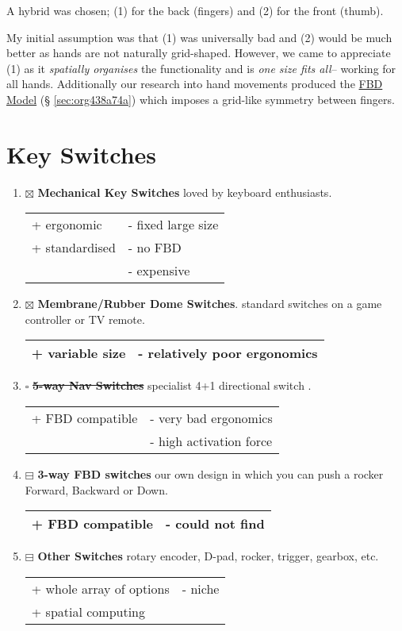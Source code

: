 \documentclass[logo,bsc,singlespacing,parskip]{infthesis}
\begin{document}
A hybrid was chosen; (1) for the back (fingers) and (2) for the front (thumb).

My initial assumption was that (1) was universally bad and (2) would be much better as hands are not naturally grid-shaped.
However, we came to appreciate (1) as it \emph{spatially organises} the functionality and is \emph{one size fits all}-- working for all hands.
Additionally our research into hand movements produced the \hyperref[sec:org438a74a]{FBD Model} (§ \ref{sec:org438a74a}) which imposes a grid-like symmetry between fingers.
\section{Key Switches}
\label{sec:org143c23c}
\begin{enumerate}
\item{$\boxtimes$} \textbf{Mechanical Key Switches} loved by keyboard enthusiasts.
\begin{longtable}{|p{6.25cm}|p{6.25cm}|}
\hline
+ ergonomic & - fixed large size\\
+ standardised & - no FBD\\
 & - expensive\\
\hline
\end{longtable}
\item{$\boxtimes$} \textbf{Membrane/Rubber Dome Switches}. standard switches on a game controller or TV remote.
\begin{longtable}{|p{6.25cm}|p{6.25cm}|}
\hline
+ variable size & - relatively poor ergonomics\\
\hline
\end{longtable}
\item{$\square$} \sout{\textbf{5-way Nav Switches}} specialist 4+1 directional switch \autocite{Thruhole5wayNavigation}.
\begin{longtable}{|p{6.25cm}|p{6.25cm}|}
\hline
+ FBD compatible & - very bad ergonomics\\
 & - high activation force\\
\hline
\end{longtable}
\item{$\boxminus$} \textbf{3-way FBD switches} our own design in which you can push a rocker Forward, Backward or Down.
\begin{longtable}{|p{6.25cm}|p{6.25cm}|}
\hline
+ FBD compatible & - could not find\\
\hline
\end{longtable}
\item{$\boxminus$} \textbf{Other Switches} rotary encoder, D-pad, rocker, trigger, gearbox, etc.
\begin{longtable}{|p{6.25cm}|p{6.25cm}|}
\hline
+ whole array of options & - niche\\
+ spatial computing & \\
\hline
\end{longtable}
\end{enumerate}
\end{document}
